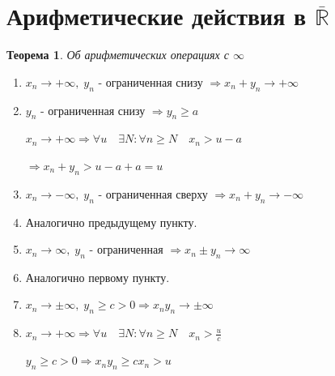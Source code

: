 \documentclass[12pt,letterpaper]{report}
\makeatletter
\newtheorem*{theorem-non}{Теорема}
\theoremstyle{definition}
\renewenvironment{proof}[1][\proofname]{%
   \par\pushQED{\qed}\normalfont%
   \topsep6\p@\@plus6\p@\relax
   \trivlist\item[\hskip\labelsep\bfseries#1\@addpunct{.}]%
   \ignorespaces
}{%
   \popQED\endtrivlist\@endpefalse
}
\makeatother
\begin{document}
    \section{Арифметические действия в $\overline{\mathbb{R}}$}
    \begin{theorem-non} Об арифметических операциях с $\infty$ \end{theorem-non}
    \begin{enumerate}
        \item $x_n \to +\infty,\; y_n$ - ограниченная снизу $\Rightarrow x_n + y_n \to +\infty$
        \begin{proof}
            $y_n$ - ограниченная снизу $\Rightarrow y_n \geqslant a$ 
            
            $x_n \to +\infty \Rightarrow \forall u \quad \exists N: \forall n \geqslant N \quad x_n > u - a$ 
            
            $\Rightarrow x_n + y_n > u - a + a = u$
        \end{proof}
        \item $x_n \to -\infty,\; y_n$ - ограниченная сверху $\Rightarrow x_n + y_n \to -\infty$
        \begin{proof}
            Аналогично предыдущему пункту.
        \end{proof}
        \item $x_n \to \infty,\; y_n$ - ограниченная $\Rightarrow x_n \pm y_n \to \infty$
        \begin{proof}
            Аналогично первому пункту.
        \end{proof}
        \item $x_n \to \pm \infty,\; y_n \geqslant c > 0 \Rightarrow x_ny_n \to \pm \infty$
        \begin{proof}
            $x_n \to +\infty \Rightarrow \forall u \quad \exists N: \forall n \geqslant N \quad x_n>\frac{u}{c}$
            
            $y_n \geqslant c > 0 \Rightarrow x_ny_n \geqslant cx_n > u$
            

\end{proof}
\end{enumerate}
\end{document}
